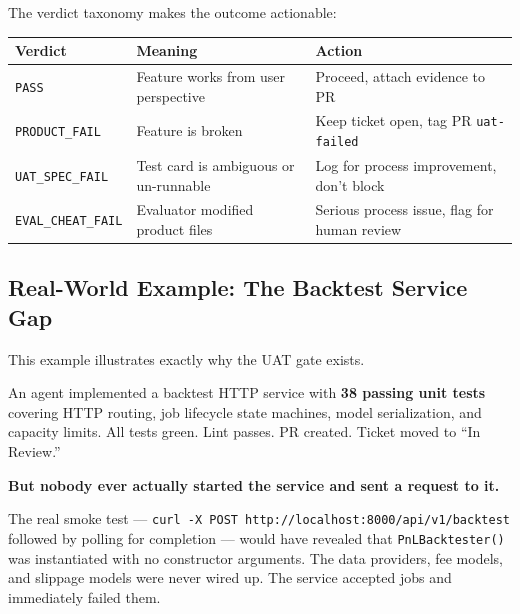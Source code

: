 \documentclass[11pt,a4paper]{article}
\newcounter{none} %
\begin{document}
The verdict taxonomy makes the outcome actionable:

{\def\LTcaptype{none} %
\begin{longtable}[]{@{}
  >{\raggedright\arraybackslash}p{}
  >{\raggedright\arraybackslash}p{}
  >{\raggedright\arraybackslash}p{}@{}}
\toprule\noalign{}
\begin{minipage}[b]{\linewidth}\raggedright
Verdict
\end{minipage} & \begin{minipage}[b]{\linewidth}\raggedright
Meaning
\end{minipage} & \begin{minipage}[b]{\linewidth}\raggedright
Action
\end{minipage} \\
\midrule\noalign{}
\endhead
\bottomrule\noalign{}
\endlastfoot
\texttt{PASS} & Feature works from user perspective & Proceed, attach evidence to PR \\
\texttt{PRODUCT\_FAIL} & Feature is broken & Keep ticket open, tag PR \texttt{uat-failed} \\
\texttt{UAT\_SPEC\_FAIL} & Test card is ambiguous or un-runnable & Log for process improvement, don't block \\
\texttt{EVAL\_CHEAT\_FAIL} & Evaluator modified product files & Serious process issue, flag for human review \\
\end{longtable}
}

\subsection{Real-World Example: The Backtest Service Gap}\label{sec:real-world-example-the-backtest-service-gap}

This example illustrates exactly why the UAT gate exists.

An agent implemented a backtest HTTP service with \textbf{38 passing unit tests} covering HTTP routing, job lifecycle state machines, model serialization, and capacity limits. All tests green. Lint passes. PR created. Ticket moved to ``In Review.''

\textbf{But nobody ever actually started the service and sent a request to it.}

The real smoke test --- \texttt{curl\ -X\ POST\ http://localhost:8000/api/v1/backtest} followed by polling for completion --- would have revealed that \texttt{PnLBacktester()} was instantiated with no constructor arguments. The data providers, fee models, and slippage models were never wired up. The service accepted jobs and immediately failed them.
\end{document}
